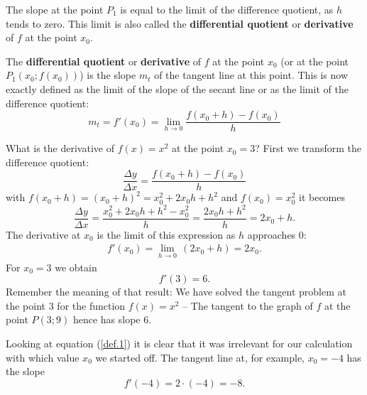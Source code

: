 \documentclass[12pt,eng]{skript_ogg}
\begin{document}
The slope at the point $P_1$ is equal to the limit of the difference quotient, as $h$ tends to zero. This limit is also called the \textbf{differential quotient} or \textbf{derivative} of $f$ at the point $x_0$.
\begin{defn}
The \textbf{differential quotient} or \textbf{derivative} of $f$ at the point $x_0$ (or at the point $P_1(x_0;f(x_0))$) is the slope $m_t$ of the tangent line at this point. This is now exactly defined as the limit of the slope of the secant line or as the limit of the difference quotient:
\[m_t=f'(x_0)=\lim_{h\rightarrow 0}\frac{f(x_0+h)-f(x_0)}{h}\]
\end{defn}

\begin{beispiel}
What is the derivative of $f(x)=x^2$ at the point $x_0=3$? First we transform the difference quotient:
\[\frac{\Delta y}{\Delta x}=\frac{f(x_0+h)-f(x_0)}{h}\]
with $f(x_0+h)=(x_0+h)^2=x_0^2+2x_0h+h^2$ and $f(x_0)=x_0^2$ it becomes
\[\frac{\Delta y}{\Delta x}=\frac{x_0^2+2x_0h+h^2-x_0^2}{h}=\frac{2x_0h+h^2}{h}=2x_0+h.\]
The derivative at $x_0$ is the limit of this expression as $h$ approaches 0:
\begin{align}\label{def.1}
f'(x_0)=\lim_{h\rightarrow 0}\,(2x_0+h)=2x_0.
\end{align}
For $x_0=3$ we obtain
\[f'(3)=6.\]
Remember the meaning of that result: We have solved the tangent problem at the point $3$ for the function $f(x)=x^2$ -- The tangent to the graph of $f$ at the point $P(3;9)$ hence has slope $6$.
\end{beispiel}
Looking at equation (\ref{def.1}) it is clear that it was irrelevant for our calculation with which value $x_0$ we started off. The tangent line at, for example, $x_0=-4$ has the slope
\[f'(-4)=2\cdot(-4)=-8.\]
\end{document}
